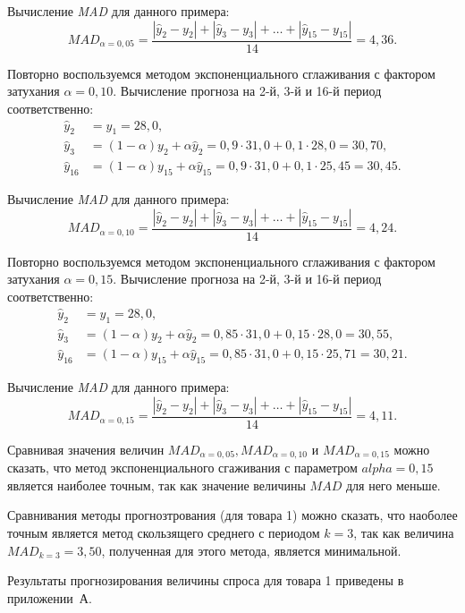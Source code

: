 Вычисление \textit{MAD} для данного примера:
\[
  MAD_{\alpha = 0{,}05} = \dfrac{|\hat{y}_2 - y_2| + |\hat{y}_3 - y_3| + \dots + |\hat{y}_{15} - y_{15}|}{14} = 4{,}36.
\]

Повторно воспользуемся методом экспоненциального сглаживания с фактором
затухания $\alpha=0{,}10$. Вычисление прогноза на 2-й, 3-й и 16-й период соответственно:
\begin{align*}
  \hat{y}_2 &= y_1 = 28{,}0, \\
  \hat{y}_3 &= (1 - \alpha) y_2 + \alpha \hat{y}_2 = 0{,}9 \cdot 31{,}0 + 0{,}1 \cdot 28{,}0 = 30{,}70, \\
  \hat{y}_{16} &= (1 - \alpha) y_{15} + \alpha \hat{y}_{15}  = 0{,}9 \cdot 31{,}0 + 0{,}1 \cdot 25{,}45 = 30{,}45.
\end{align*}

Вычисление \textit{MAD} для данного примера:
\[
  MAD_{\alpha = 0{,}10} = \dfrac{|\hat{y}_2 - y_2| + |\hat{y}_3 - y_3| + \dots + |\hat{y}_{15} - y_{15}|}{14} = 4{,}24.
\]

Повторно воспользуемся методом экспоненциального сглаживания с фактором
затухания $\alpha=0{,}15$. Вычисление прогноза на 2-й, 3-й и 16-й период соответственно:
\begin{align*}
  \hat{y}_2 &= y_1 = 28{,}0, \\
  \hat{y}_3 &= (1 - \alpha) y_2 + \alpha \hat{y}_2 = 0{,}85 \cdot 31{,}0 + 0{,}15 \cdot 28{,}0 = 30{,}55, \\
  \hat{y}_{16} &= (1 - \alpha) y_{15} + \alpha \hat{y}_{15}  = 0{,}85 \cdot 31{,}0 + 0{,}15 \cdot 25{,}71 = 30{,}21.
\end{align*}

Вычисление \textit{MAD} для данного примера:
\[
  MAD_{\alpha = 0{,}15} = \dfrac{|\hat{y}_2 - y_2| + |\hat{y}_3 - y_3| + \dots + |\hat{y}_{15} - y_{15}|}{14} = 4{,}11.
\]

Сравнивая значения величин $MAD_{\alpha = 0{,}05}, MAD_{\alpha = 0{,}10}$ и $MAD_{\alpha = 0{,}15}$
можно сказать, что метод экспоненциального сгаживания с параметром $alpha = 0{,}15$
является наиболее точным, так как значение величины $MAD$ для него меньше.  

Сравнивания методы прогнозтрования (для товара 1) можно сказать, что наоболее точным
является метод скользящего среднего с периодом $k = 3$, так как величина
$ MAD_{k=3} = 3{,}50$, полученная для этого метода, является минимальной.

Результаты прогнозирования величины спроса для товара 1 приведены в приложении~А.



